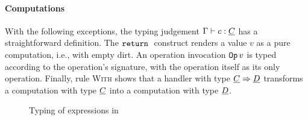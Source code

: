 \paragraph{Computations}
With the following exceptions, the typing judgement $\Gamma \vdash c : \underline{C}$ has a straightforward definition. The $\mathtt{return}\;$ construct renders a value $v$ as a pure computation, i.e., with empty dirt. An operation invocation $\mathtt{Op}\,v$ is typed according to the operation's signature, with the operation itself as its only operation. Finally, rule \textsc{With} shows that a handler with type $\underline{C} \Rightarrow \underline{D}$ transforms a computation with type $\underline{C}$ into a computation with type $\underline{D}$. \cite{inferring}

\begin{figure}[!htb]
\begin{center}
\end{center}
\caption{Typing of expressions in \eff}\label{fig:eff-typing:e}
\end{figure}

